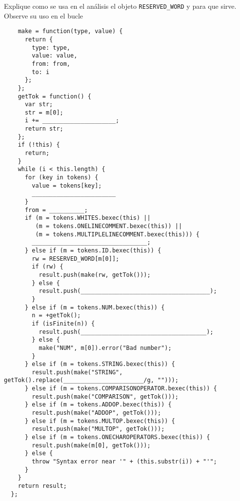 Explique como se usa en el análisis el objeto \texttt{RESERVED\_WORD} y
para que sirve. Observe su uso en el bucle

\begin{verbatim}
    make = function(type, value) {
      return {
        type: type,
        value: value,
        from: from,
        to: i
      };
    };
    getTok = function() {
      var str;
      str = m[0];
      i += _____________________;
      return str;
    };
    if (!this) {
      return;
    }
    while (i < this.length) {
      for (key in tokens) {
        value = tokens[key];
        ________________________
      }
      from = __________;
      if (m = tokens.WHITES.bexec(this) || 
         (m = tokens.ONELINECOMMENT.bexec(this)) || 
         (m = tokens.MULTIPLELINECOMMENT.bexec(this))) {
        _________________________________;
      } else if (m = tokens.ID.bexec(this)) {
        rw = RESERVED_WORD[m[0]];
        if (rw) {
          result.push(make(rw, getTok()));
        } else {
          result.push(_____________________________________);
        }
      } else if (m = tokens.NUM.bexec(this)) {
        n = +getTok();
        if (isFinite(n)) {
          result.push(____________________________________);
        } else {
          make("NUM", m[0]).error("Bad number");
        }
      } else if (m = tokens.STRING.bexec(this)) {
        result.push(make("STRING", getTok().replace(_______________________/g, "")));
      } else if (m = tokens.COMPARISONOPERATOR.bexec(this)) {
        result.push(make("COMPARISON", getTok()));
      } else if (m = tokens.ADDOP.bexec(this)) {
        result.push(make("ADDOP", getTok()));
      } else if (m = tokens.MULTOP.bexec(this)) {
        result.push(make("MULTOP", getTok()));
      } else if (m = tokens.ONECHAROPERATORS.bexec(this)) {
        result.push(make(m[0], getTok()));
      } else {
        throw "Syntax error near '" + (this.substr(i)) + "'";
      }
    }
    return result;
  };
\end{verbatim}

